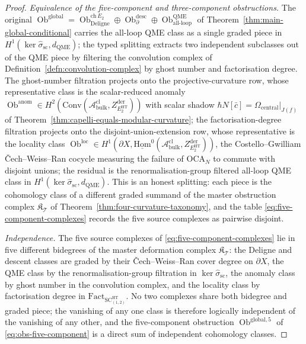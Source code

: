 \begin{proof}
\emph{Equivalence of the five-component and three-component
obstructions.}  The original
\(\operatorname{Ob}^{\mathrm{global}}=
\operatorname{Ob}^{\mathrm{ch}\,E_2}_{\mathrm{Deligne}}\oplus
\operatorname{Ob}^{\mathrm{desc}}_{\partial}\oplus
\operatorname{Ob}^{\mathrm{QME}}_{\mathrm{all\mbox{-}loop}}\) of
Theorem~\ref{thm:main-global-conditional} carries the all-loop QME
class as a single graded piece in
\(H^1(\ker\widehat\sigma_{\mathrm{sc}},d_{\mathrm{QME}})\); the typed
splitting extracts two independent subclasses out of the QME piece by
filtering the convolution complex of
Definition~\ref{defn:convolution-complex} by ghost number and
factorisation degree.  The ghost-number filtration projects onto the
projective-curvature row, whose representative class is the
scalar-reduced anomaly
\(\operatorname{Ob}^{\mathrm{anom}}\in
H^2(\mathrm{Conv}(\mathcal A^{\mathrm{cl}}_{\mathrm{bulk}},
Z^{\mathrm{der}}_{E_2^{\mathrm{HT}}}))\) with scalar shadow
\(\hbar N[\bar c]=\Omega_{\mathrm{central}}|_{J(f)}\) of
Theorem~\ref{thm:capelli-equals-modular-curvature}; the
factorisation-degree filtration projects onto the
disjoint-union-extension row, whose representative is the locality
class
\(\operatorname{Ob}^{\mathrm{loc}}\in
H^1(\partial X,\underline{\mathrm{Hom}}^{0}(
\mathcal A^{\mathrm{cl}}_{\mathrm{bulk}},
Z^{\mathrm{der}}_{E_2^{\mathrm{HT}}}))\), the Costello--Gwilliam
Čech--Weiss--Ran cocycle measuring the failure of
\(\mathrm{OCA}_N\) to commute with disjoint unions; the residual is
the renormalisation-group filtered all-loop QME class in
\(H^1(\ker\widehat\sigma_{\mathrm{sc}},d_{\mathrm{QME}})\).  This is an
honest splitting: each piece is the cohomology class of a different
graded summand of the master obstruction complex
\(\mathfrak K_{\mathcal T}\) of
Theorem~\ref{thm:four-curvature-taxonomy}, and the table
\eqref{eq:five-component-complexes} records the five source complexes
as pairwise disjoint.

\emph{Independence.}  The five source complexes of
\eqref{eq:five-component-complexes} lie in five different bidegrees
of the master deformation complex
\(\mathfrak K_{\mathcal T}\): the Deligne and descent classes are
graded by their Čech--Weiss--Ran cover degree on \(\partial X\), the
QME class by the renormalisation-group filtration in
\(\ker\widehat\sigma_{\mathrm{sc}}\), the anomaly class by ghost
number in the convolution complex, and the locality class by
factorisation degree in
\(\mathrm{Fact}_{\mathrm{SC}^{\mathrm{HT}}_{(1,2)}}\).  No two
complexes share both bidegree and graded piece; the vanishing of any
one class is therefore logically independent of the vanishing of any
other, and the five-component obstruction
\(\operatorname{Ob}^{\mathrm{global,5}}\) of
\eqref{eq:obs-five-component} is a direct sum of independent
cohomology classes.


\end{proof}
